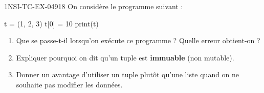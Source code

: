 \begin{exercice}{1NSI-TC-EX-049}{1}{8}
On considère le programme suivant :
\begin{python}
t = (1, 2, 3)
t[0] = 10
print(t)
\end{python}
\begin{enumerate}
  \item Que se passe-t-il lorsqu'on exécute ce programme ? Quelle erreur obtient-on ?
  \item Expliquer pourquoi on dit qu'un tuple est \textbf{immuable} (non mutable).
  \item Donner un avantage d'utiliser un tuple plutôt qu'une liste quand on
        ne souhaite pas modifier les données.
\end{enumerate}
\end{exercice}

